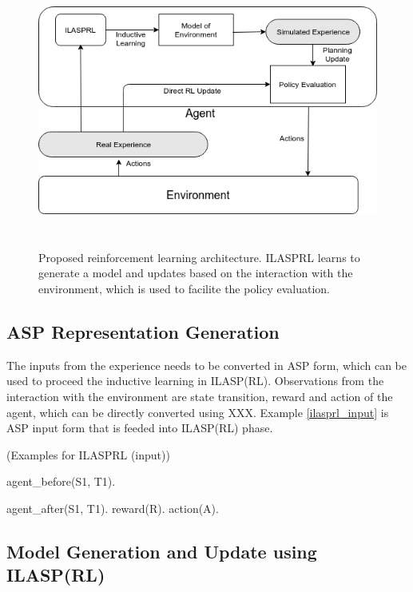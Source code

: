 \documentclass[12pt,twoside]{report}
\begin{document}
\begin{figure}[!htb]
\centering
\includegraphics[width=15cm, height=9cm]{./figures/ILASRL}
\caption{Proposed reinforcement learning architecture. ILASPRL learns to generate a model and updates based on the interaction with the environment, which is used to facilite the policy evaluation. }
\label{proposed_architecture}
\end{figure}


\subsection{ASP Representation Generation}

The inputs from the experience needs to be converted in ASP form, which can be used to proceed the inductive learning in ILASP(RL).
Observations from the interaction with the environment are state transition, reward and action of the agent, which can be directly converted using XXX. Example \ref{ilasprl_input} is ASP input form that is feeded into ILASP(RL) phase.

\begin{examp} (Examples for ILASPRL (input))

agent\_before(S1, T1).

agent\_after(S1, T1).
reward(R).
action(A).

\end{examp}
\label{ilasprl_input}

\subsection{Model Generation and Update using ILASP(RL)}
\end{document}
